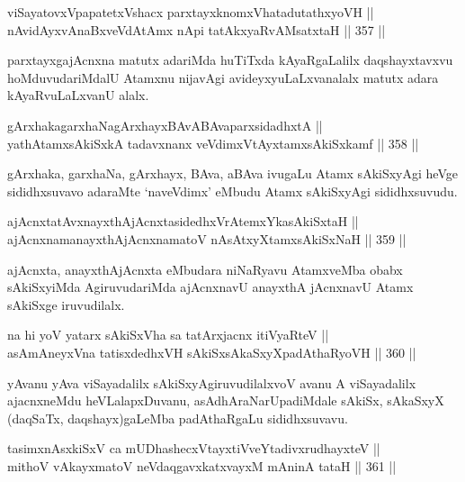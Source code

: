 \begin{shl}
viSayatovxVpapatetxVshacx parxtayxknomxVhatadutathxyoVH ||  \\
nAvidAyxvAnaBxveVdAtAmx nApi tatAkxyaRvAMsatxtaH ||  357 ||  
\end{shl}

\begin{artha}
parxtayxgajAcnxna matutx adariMda huTiTxda kAyaRgaLalilx
daqshayxtavxvu hoMduvudariMdalU Atamxnu nijavAgi avideyxyuLaLxvanalalx
matutx adara kAyaRvuLaLxvanU alalx.
\end{artha}

\begin{shl}
gArxhakagarxhaNagArxhayxBAvABAvaparxsidadhxtA || \\
yathA\s \s tamxsAkiSxkA tadavxnanx veVdimxVtAyxtamxsAkiSxkamf ||  358 ||  
\end{shl}

\begin{artha}
gArxhaka, garxhaNa, gArxhayx, BAva, aBAva ivugaLu Atamx sAkiSxyAgi
heVge sididhxsuvavo adaraMte `naveVdimx' eMbudu Atamx sAkiSxyAgi
sididhxsuvudu.
\end{artha}

\begin{shl}
ajAcnxtatAvxnayxthAjAcnxtasidedhxVrAtemxYkasAkiSxtaH || \\
ajAcnxnamanayxthAjAcnxnamatoV nAsAtxyXtamxsAkiSxNaH ||  359 ||  
\end{shl}

\begin{artha}
ajAcnxta, anayxthAjAcnxta eMbudara niNaRyavu AtamxveMba obabx
sAkiSxyiMda AgiruvudariMda ajAcnxnavU anayxthA jAcnxnavU Atamx
sAkiSxge iruvudilalx.
\end{artha}

\begin{shl}
na hi yoV yatarx sAkiSxVha sa tatArxjacnx itiVyaRteV || \\
asAmAneyxVna tatisxdedhxVH sAkiSxsAkaSxyXpadAthaRyoVH ||  360 ||  
\end{shl}

\begin{artha}
yAvanu yAva viSayadalilx sAkiSxyAgiruvudilalxvoV avanu A viSayadalilx
ajacnxneMdu heVLalapxDuvanu, asAdhAraNarUpadiMdale sAkiSx, sAkaSxyX
(daqSaTx, daqshayx)gaLeMba padAthaRgaLu sididhxsuvavu.
\end{artha}


\begin{shl}
tasimxnAsxkiSxV ca mUDhashecxVtayxtiVveYtadivxrudhayxteV || \\
mithoV vAkayxmatoV neVdaqgavxkatxvayxM mAninA tataH ||  361 ||  
\end{shl}

